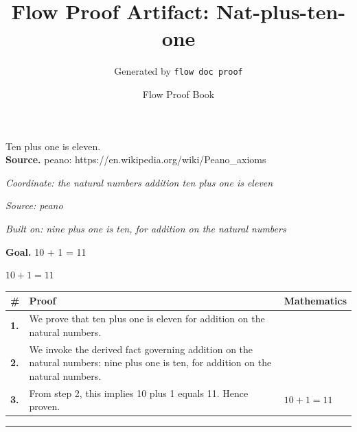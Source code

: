 \documentclass[11pt]{article}
\title{Flow Proof Artifact: Nat-plus-ten-one}
\author{Generated by \texttt{flow doc proof}}
\date{Flow Proof Book}
\theoremstyle{definition}
\begin{document}
\maketitle
Ten plus one is eleven.\\[0.5em]
\textbf{Source.} peano: https://en.wikipedia.org/wiki/Peano\_axioms\\[0.5em]
\bigskip
{}\par
\smallskip\noindent\textit{Coordinate: the natural numbers \cdot addition \cdot ten plus one is eleven}\par
\smallskip\noindent\textit{Source: peano}\par
\smallskip\noindent\textit{Built on: nine plus one is ten, for addition on the natural numbers}\par
\medskip
\noindent\textbf{Goal.} 10 + 1 = 11\par
\noindent$\displaystyle 10 + 1 = 11$\par
\medskip
\noindent
\begin{tabular}{@{} >{\raggedright\arraybackslash}p{} >{\raggedright\arraybackslash}p{} >{\raggedleft\arraybackslash}p{} @{}}
\textbf{\#} & \textbf{Proof} & \textbf{Mathematics} \\
\midrule
\textbf{1.} & We prove that ten plus one is eleven for addition on the natural numbers. & \\[0.45em]
\textbf{2.} & We invoke the derived fact governing addition on the natural numbers: nine plus one is ten, for addition on the natural numbers. & \\[0.45em]
\textbf{3.} & From step 2, this implies 10 plus 1 equals 11. Hence proven. & $\displaystyle 10 + 1 = 11$ \\[0.45em]
\bottomrule
\end{tabular}
\label{thm:Nat-addition-ten_plus_one_is_eleven}
\par\medskip\hrule
\end{document}
